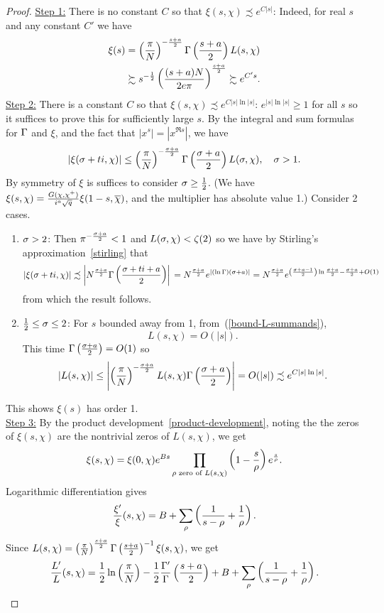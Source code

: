 \begin{proof}
\noindent \underline{Step 1:} There is no constant $C$ so that $\xi(s,\chi)\precsim e^{C|s|}$: Indeed, for real $s$ and any constant $C'$ we have
\begin{align*}
\xi(s)&=\left( {\frac{\pi}{N}} \right)^{-\frac{s+a}2}\Gamma\left( {\frac{s+a}{2}} \right)L(s,\chi)\\
&\succsim s^{-\frac{1}{2}}\left( {\frac{(s+a)N}{2e\pi}} \right)^{\frac{s+a}2}
\succsim e^{C's}.
\end{align*}
\noindent\underline{Step 2:} There is a constant $C$ so that $\xi(s,\chi)\precsim e^{C|s|\ln|s|}$: $e^{|s|\ln|s|}\ge1$ for all $s$ so it suffices to prove this for sufficiently large $s$. By the integral and sum formulas for $\Gamma$ and $\xi$, and the fact that $|x^s|=|x^{\Re s}|$, we have
\[
|\xi(\sigma+ti,\chi)|\le \left( {\frac{\pi}{N}} \right)^{-\frac{\sigma+a}{2}}\Gamma\left( {\frac{\sigma+a}{2}} \right)L(\sigma,\chi),\quad \sigma>1.
\]
By symmetry of $\xi$ is suffices to consider $\sigma\ge \frac{1}{2}$. (We have $\xi(s,\chi)=\frac{G(\chi,\chi^+)}{i^a\sqrt q}\xi(1-s,\overline{\chi})$, and the multiplier has absolute value 1.) Consider 2 cases.
\begin{enumerate}
\item
$\sigma>2$: Then $\pi^{-\frac{\sigma+a}{2}}<1$ and $L(\sigma,\chi)<\zeta(2)$ so we have by Stirling's approximation~\ref{stirling} that
\[
|\xi(\sigma+ti,\chi)|\precsim
\left| {N^{\frac{\sigma+a}{2}}\Gamma\left( {\frac{\sigma+ti+a}{2}} \right)} \right|\\
=N^{\frac{\sigma+a}{2}}e^{|(\ln\Gamma)(\sigma+a)|}=N^{\frac{\sigma+a}{2}}e^{\left( {\frac{\sigma+a-1}2} \right)\ln\frac{\sigma+a}2 -\frac{\sigma+a}2+O(1)}
\]
from which the result follows.
\item
$\frac12\le \sigma\le 2$: %
For $s$ bounded away from 1, from~(\ref{bound-L-summands}),
\[
L(s,\chi)=O(|s|).
\]
This time $\Gamma\left( {\frac{\sigma+a}{2}} \right)=O(1)$ so
\[
|L(s,\chi)|\le \left| {
\left( {\frac{\pi}{N}} \right)^{-\frac{\sigma+a}2}L(s,\chi)\Gamma\left( {\frac{\sigma+a}{2}} \right)} \right|
=O(|s|)\precsim e^{C|s|\ln|s|}.
\]
\end{enumerate}
This shows $\xi(s)$ has order 1.\\

\noindent\underline{Step 3:} By the product development~\ref{product-development}, noting the the zeros of $\xi(s,\chi)$ are the nontrivial zeros of $L(s,\chi)$, we get
\[
\xi(s,\chi)=\xi(0,\chi)e^{Bs}\prod_{\rho\text{ zero of }L(s,\chi)}\left( {1-\frac{s}{\rho}} \right)e^{\frac s{\rho}}.
\]
Logarithmic differentiation gives
\[
\frac{\xi'}{\xi}(s,\chi)=B+\sum_{\rho} \left( {\frac{1}{s-\rho}+\frac{1}{\rho}} \right).
\]
Since $L(s,\chi)=\left( {\frac{\pi}{N}} \right)^{\frac{s+a}2}\Gamma\left( {\frac{s+a}{2}} \right)^{-1}\xi(s,\chi)$, we get
\[
\frac{L'}{L}(s,\chi)=\frac{1}{2}\ln\left( {\frac{\pi}{N}} \right) -\frac{1}{2}\frac{\Gamma'}{\Gamma}\left( {\frac{s+a}{2}} \right)+B+\sum_{\rho} \left( {\frac{1}{s-\rho}+\frac{1}{\rho}} \right).\qedhere
\]
\end{proof}
